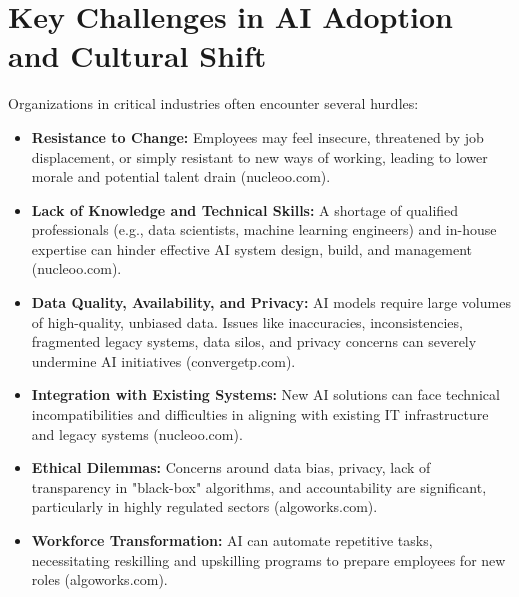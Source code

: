 \section{Key Challenges in AI Adoption and Cultural Shift}
Organizations in critical industries often encounter several hurdles:
\begin{itemize}
    \item \textbf{Resistance to Change:} Employees may feel insecure, threatened by job displacement, or simply resistant to new ways of working, leading to lower morale and potential talent drain (nucleoo.com).
    \item \textbf{Lack of Knowledge and Technical Skills:} A shortage of qualified professionals (e.g., data scientists, machine learning engineers) and in-house expertise can hinder effective AI system design, build, and management (nucleoo.com).
    \item \textbf{Data Quality, Availability, and Privacy:} AI models require large volumes of high-quality, unbiased data. Issues like inaccuracies, inconsistencies, fragmented legacy systems, data silos, and privacy concerns can severely undermine AI initiatives (convergetp.com).
    \item \textbf{Integration with Existing Systems:} New AI solutions can face technical incompatibilities and difficulties in aligning with existing IT infrastructure and legacy systems (nucleoo.com).
    \item \textbf{Ethical Dilemmas:} Concerns around data bias, privacy, lack of transparency in "black-box" algorithms, and accountability are significant, particularly in highly regulated sectors (algoworks.com).
    \item \textbf{Workforce Transformation:} AI can automate repetitive tasks, necessitating reskilling and upskilling programs to prepare employees for new roles (algoworks.com).
\end{itemize}

